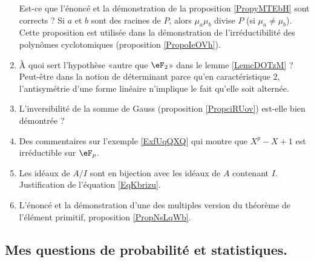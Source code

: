 \begin{enumerate}
        Est-ce que l'énoncé et la démonstration de la proposition \ref{PropyMTEbH} sont corrects ? Si \( a\) et \( b\) sont des racines de \( P\), alors \( \mu_a\mu_b\) divise \( P\) (si \( \mu_a\neq \mu_b\)). Cette proposition est utilisée dans la démonstration de l'irréductibilité des polynômes cyclotomiques (proposition \ref{PropoIeOVh}).
    \item
        À quoi sert l'hypothèse «autre que \( \eF_2\)» dans le lemme \ref{LemcDOTzM} ? Peut-être dans la notion de déterminant parce qu'en caractéristique \( 2\), l'antisymétrie d'une forme linéaire n'implique le fait qu'elle soit alternée.
    \item
        L'inversibilité de la somme de Gauss (proposition \ref{PropciRUov}) est-elle bien démontrée ?
    \item
        Des commentaires sur l'exemple \ref{ExfUqQXQ} qui montre que \( X^p-X+1\) est irréductible sur \( \eF_p\).
    \item
        Les idéaux de \( A/I\) sont en bijection avec les idéaux de \( A\) contenant \( I\). Justification de l'équation \eqref{EqKbrizu}.
    \item
        L'énoncé et la démonstration d'une des multiples version du théorème de l'élément primitif, proposition \ref{PropNsLqWb}.
\end{enumerate}

\subsection{Mes questions de probabilité et statistiques.}

